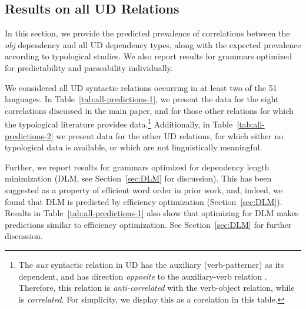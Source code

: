 \documentclass[10pt,twoside,lineno]{article}
\begin{document}
\subsection{Results on all UD Relations}
In this section, we provide the predicted prevalence of correlations between the \emph{obj} dependency and all UD dependency types, along with the expected prevalence according to typological studies.
We also report results for grammars optimized for predictability and parseability individually.


We considered all UD syntactic relations occurring in at least two of the 51 languages.
In Table~\ref{tab:all-predictions-1}, we present the data for the eight correlations discussed in the main paper, and for those other relations for which the typological literature provides data.\footnote{The \emph{aux} syntactic relation in UD has the auxiliary (verb-patterner) as its dependent, and has direction \emph{opposite} to the auxiliary-verb relation . Therefore, this relation is \emph{anti-correlated} with the verb-object relation, while  is \emph{correlated}.  For simplicity, we display this as a corelation in this table.}
Additionally, in Table~\ref{tab:all-predictions-2} we present data for the other UD relations, for which either no typological data is available, or which are not linguistically meaningful.




Further, we report results for grammars optimized for dependency length minimization (DLM, see Section~\ref{sec:DLM} for discussion).
This has been suggested as a property of efficient word order in prior work, and, indeed, we found that DLM is predicted by efficiency optimization (Section~\ref{sec:DLM}).
Results in Table~\ref{tab:all-predictions-1} also show that optimizing for DLM makes predictions similar to efficiency optimization. See Section~\ref{sec:DLM} for further discussion.
\end{document}
